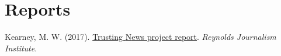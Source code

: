 \section{Reports}
\begin{bibenum}
\item Kearney, M. W. (2017). \href{https://www.rjionline.org/reporthtml.html}{Trusting {N}ews project report}.
\textit{Reynolds Journalism Institute}.
\end{bibenum}
